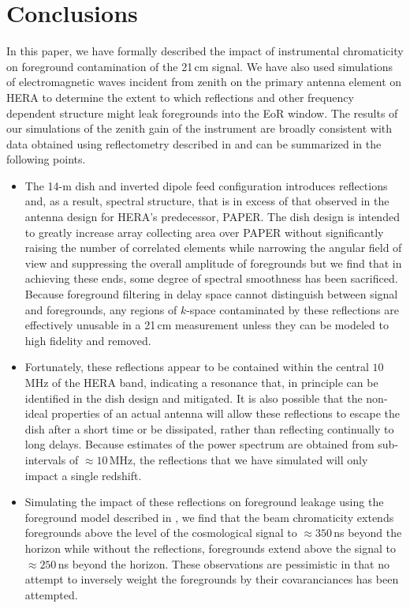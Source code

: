 \documentclass[twocolumn]{emulateapj}
\begin{document}
\section{Conclusions}
In this paper, we have formally described the impact of instrumental chromaticity on foreground contamination of the 21\,cm signal. We have also used simulations of electromagnetic waves incident from zenith on the primary antenna element on HERA to determine the extent to which reflections and other frequency dependent structure might leak foregrounds into the EoR window. The results of our simulations of the zenith gain of the instrument are broadly consistent with data obtained using reflectometry described in \citep{Patra:2015} and can be summarized in the following points. 
\begin{itemize}
\item The 14-m dish and inverted dipole feed configuration introduces reflections and, as a result, spectral structure, that is in excess of that observed in the antenna design for HERA's predecessor, PAPER. The dish design is intended to greatly increase array collecting area over PAPER without significantly raising the number of correlated elements while narrowing the angular field of view and suppressing the overall amplitude of foregrounds but we find that in achieving these ends, some degree of spectral smoothness has been sacrificed. Because foreground filtering in delay space cannot distinguish between signal and foregrounds, any regions of $k$-space contaminated by these reflections are effectively unusable in a 21\,cm measurement unless they can be modeled to high fidelity and removed. 

\item Fortunately, these reflections appear to be contained within the central $10$\,MHz of the HERA band, indicating a resonance that, in principle can be identified in the dish design and mitigated. It is also possible that the  non-ideal properties of an actual antenna will allow these reflections to escape the dish after a short time or be dissipated, rather than reflecting continually to long delays. Because estimates of the power spectrum are obtained from sub-intervals of $\approx10$\,MHz, the reflections that we have simulated will only impact a single redshift.

\item Simulating the impact of these reflections on foreground leakage using the foreground model described in \citet{Thyagarajan:2015c}, we find that the beam chromaticity extends foregrounds above the level of the cosmological signal to $\approx 350$\,ns beyond the horizon while without the reflections, foregrounds extend above the signal to $\approx 250$\,ns beyond the horizon. These observations are pessimistic in that no attempt to inversely weight the foregrounds by their covaranciances has been attempted. 


\end{itemize}
\end{document}
